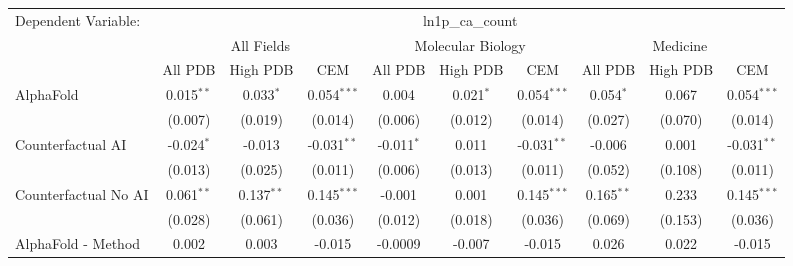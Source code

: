 \begingroup
\centering
\begin{tabular}{lccccccccc}
   \tabularnewline \midrule \midrule
   Dependent Variable: & \multicolumn{9}{c}{ln1p\_ca\_count}\\
 & \multicolumn{3}{c}{All Fields} & \multicolumn{3}{c}{Molecular Biology} & \multicolumn{3}{c}{Medicine} \\
\cmidrule(lr){2-7} \cmidrule(lr){5-10} \cmidrule(lr){8-7}
 & \multicolumn{1}{c}{All PDB} & \multicolumn{1}{c}{High PDB} & \multicolumn{1}{c}{CEM} & \multicolumn{1}{c}{All PDB} & \multicolumn{1}{c}{High PDB} & \multicolumn{1}{c}{CEM} & \multicolumn{1}{c}{All PDB} & \multicolumn{1}{c}{High PDB} & \multicolumn{1}{c}{CEM} \\
\cmidrule(lr){2-3} \cmidrule(lr){3-4} \cmidrule(lr){4-5} \cmidrule(lr){5-6} \cmidrule(lr){6-7} \cmidrule(lr){7-8} \cmidrule(lr){8-9} \cmidrule(lr){9-10} \cmidrule(lr){10-3}
   AlphaFold                                                   & 0.015$^{**}$   & 0.033$^{*}$    & 0.054$^{***}$  & 0.004         & 0.021$^{*}$    & 0.054$^{***}$  & 0.054$^{*}$   & 0.067        & 0.054$^{***}$\\   
                                                               & (0.007)        & (0.019)        & (0.014)        & (0.006)       & (0.012)        & (0.014)        & (0.027)       & (0.070)      & (0.014)\\   
   Counterfactual AI                                           & -0.024$^{*}$   & -0.013         & -0.031$^{**}$  & -0.011$^{*}$  & 0.011          & -0.031$^{**}$  & -0.006        & 0.001        & -0.031$^{**}$\\   
                                                               & (0.013)        & (0.025)        & (0.011)        & (0.006)       & (0.013)        & (0.011)        & (0.052)       & (0.108)      & (0.011)\\   
   Counterfactual No AI                                        & 0.061$^{**}$   & 0.137$^{**}$   & 0.145$^{***}$  & -0.001        & 0.001          & 0.145$^{***}$  & 0.165$^{**}$  & 0.233        & 0.145$^{***}$\\   
                                                               & (0.028)        & (0.061)        & (0.036)        & (0.012)       & (0.018)        & (0.036)        & (0.069)       & (0.153)      & (0.036)\\   
   AlphaFold - Method                                          & 0.002          & 0.003          & -0.015         & -0.0009       & -0.007         & -0.015         & 0.026         & 0.022        & -0.015\\   

\end{tabular}
